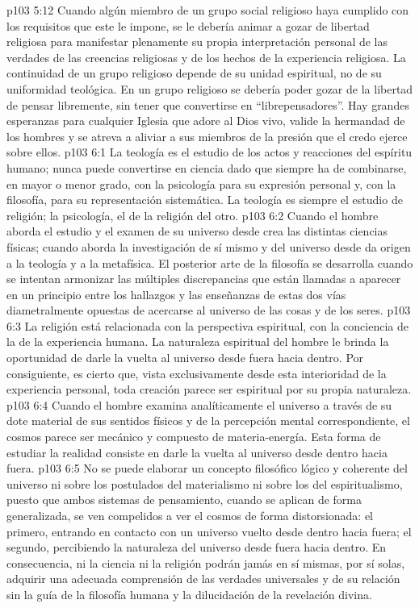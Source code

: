 \vs p103 5:12 Cuando algún miembro de un grupo social religioso haya cumplido con los requisitos que este le impone, se le debería animar a gozar de libertad religiosa para manifestar plenamente su propia interpretación personal de las verdades de las creencias religiosas y de los hechos de la experiencia religiosa. La continuidad de un grupo religioso depende de su unidad espiritual, no de su uniformidad teológica. En un grupo religioso se debería poder gozar de la libertad de pensar libremente, sin tener que convertirse en “librepensadores”. Hay grandes esperanzas para cualquier Iglesia que adore al Dios vivo, valide la hermandad de los hombres y se atreva a aliviar a sus miembros de la presión que el credo ejerce sobre ellos.
\vs p103 6:1 La teología es el estudio de los actos y reacciones del espíritu humano; nunca puede convertirse en ciencia dado que siempre ha de combinarse, en mayor o menor grado, con la psicología para su expresión personal y, con la filosofía, para su representación sistemática. La teología es siempre el estudio de  religión; la psicología, el de la religión del otro.
\vs p103 6:2 \pc Cuando el hombre aborda el estudio y el examen de su universo desde  crea las distintas ciencias físicas; cuando aborda la investigación de sí mismo y del universo desde  da origen a la teología y a la metafísica. El posterior arte de la filosofía se desarrolla cuando se intentan armonizar las múltiples discrepancias que están llamadas a aparecer en un principio entre los hallazgos y las enseñanzas de estas dos vías diametralmente opuestas de acercarse al universo de las cosas y de los seres.
\vs p103 6:3 La religión está relacionada con la perspectiva espiritual, con la conciencia de la  de la experiencia humana. La naturaleza espiritual del hombre le brinda la oportunidad de darle la vuelta al universo desde fuera hacia dentro. Por consiguiente, es cierto que, vista exclusivamente desde esta interioridad de la experiencia personal, toda creación parece ser espiritual por su propia naturaleza.
\vs p103 6:4 Cuando el hombre examina analíticamente el universo a través de su dote material de sus sentidos físicos y de la percepción mental correspondiente, el cosmos parece ser mecánico y compuesto de materia\hyp{}energía. Esta forma de estudiar la realidad consiste en darle la vuelta al universo desde dentro hacia fuera.
\vs p103 6:5 \pc No se puede elaborar un concepto filosófico lógico y coherente del universo ni sobre los postulados del materialismo ni sobre los del espiritualismo, puesto que ambos sistemas de pensamiento, cuando se aplican de forma generalizada, se ven compelidos a ver el cosmos de forma distorsionada: el primero, entrando en contacto con un universo vuelto desde dentro hacia fuera; el segundo, percibiendo la naturaleza del universo desde fuera hacia dentro. En consecuencia, ni la ciencia ni la religión podrán jamás en sí mismas, por sí solas, adquirir una adecuada comprensión de las verdades universales y de su relación sin la guía de la filosofía humana y la dilucidación de la revelación divina.

